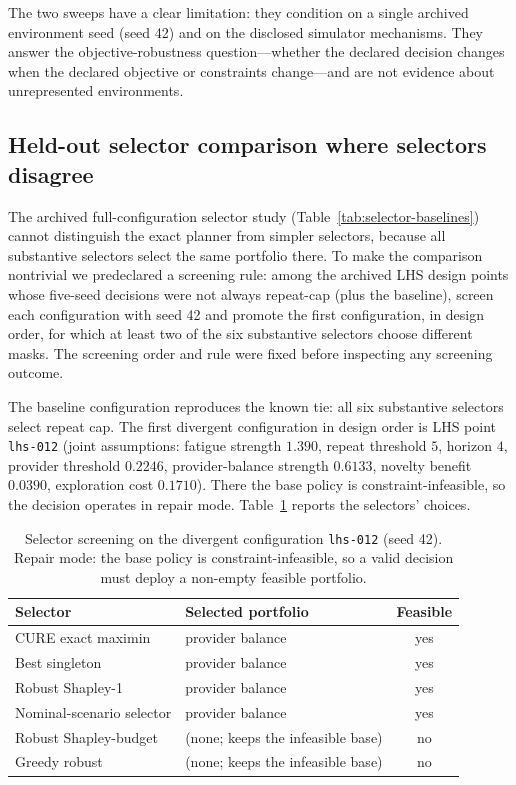 \documentclass[pdflatex,sn-mathphys-num]{sn-jnl}
\theoremstyle{thmstyleone}
\theoremstyle{thmstyletwo}
\theoremstyle{thmstylethree}
\begin{document}
The two sweeps have a clear limitation: they condition on a single archived environment seed (seed 42) and on the disclosed simulator mechanisms. They answer the objective-robustness question---whether the declared decision changes when the declared objective or constraints change---and are not evidence about unrepresented environments.

\subsection{Held-out selector comparison where selectors disagree}\label{sec:divergent-selectors}

The archived full-configuration selector study (Table~\ref{tab:selector-baselines}) cannot distinguish the exact planner from simpler selectors, because all substantive selectors select the same portfolio there. To make the comparison nontrivial we predeclared a screening rule: among the archived LHS design points whose five-seed decisions were not always repeat-cap (plus the baseline), screen each configuration with seed 42 and promote the first configuration, in design order, for which at least two of the six substantive selectors choose different masks. The screening order and rule were fixed before inspecting any screening outcome.

The baseline configuration reproduces the known tie: all six substantive selectors select repeat cap. The first divergent configuration in design order is LHS point \texttt{lhs-012} (joint assumptions: fatigue strength $1.390$, repeat threshold $5$, horizon $4$, provider threshold $0.2246$, provider-balance strength $0.6133$, novelty benefit $0.0390$, exploration cost $0.1710$). There the base policy is constraint-infeasible, so the decision operates in repair mode. Table~\ref{tab:divergent-screening} reports the selectors' choices.

\begin{table}[t]
\caption{Selector screening on the divergent configuration \texttt{lhs-012} (seed 42). Repair mode: the base policy is constraint-infeasible, so a valid decision must deploy a non-empty feasible portfolio.}\label{tab:divergent-screening}
\centering
\scriptsize
\setlength{\tabcolsep}{4pt}
\begin{tabular}{@{}llc@{}}
\toprule
Selector & Selected portfolio & Feasible\\
\midrule
CURE exact maximin & provider balance & yes\\
Best singleton & provider balance & yes\\
Robust Shapley-1 & provider balance & yes\\
Nominal-scenario selector & provider balance & yes\\
Robust Shapley-budget & (none; keeps the infeasible base) & no\\
Greedy robust & (none; keeps the infeasible base) & no\\
\bottomrule
\end{tabular}
\end{table}
\end{document}
